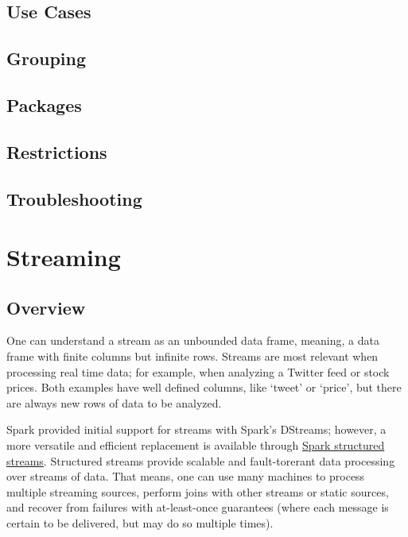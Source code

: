 \documentclass[]{book}
\theoremstyle{definition}
\theoremstyle{definition}
\theoremstyle{definition}
\theoremstyle{remark}
\begin{document}
\hypertarget{use-cases}{%
\section{Use Cases}\label{use-cases}}

\hypertarget{grouping}{%
\section{Grouping}\label{grouping}}

\hypertarget{packages}{%
\section{Packages}\label{packages}}

\hypertarget{restrictions}{%
\section{Restrictions}\label{restrictions}}

\hypertarget{troubleshooting-2}{%
\section{Troubleshooting}\label{troubleshooting-2}}

\hypertarget{streaming}{%
\chapter{Streaming}\label{streaming}}

\hypertarget{overview-4}{%
\section{Overview}\label{overview-4}}

One can understand a stream as an unbounded data frame, meaning, a data
frame with finite columns but infinite rows. Streams are most relevant
when processing real time data; for example, when analyzing a Twitter
feed or stock prices. Both examples have well defined columns, like
`tweet' or `price', but there are always new rows of data to be
analyzed.

Spark provided initial support for streams with Spark's DStreams;
however, a more versatile and efficient replacement is available through
\href{https://spark.apache.org/docs/latest/structured-streaming-programming-guide.html}{Spark
structured streams}. Structured streams provide scalable and
fault-torerant data processing over streams of data. That means, one can
use many machines to process multiple streaming sources, perform joins
with other streams or static sources, and recover from failures with
at-least-once guarantees (where each message is certain to be delivered,
but may do so multiple times).
\end{document}
